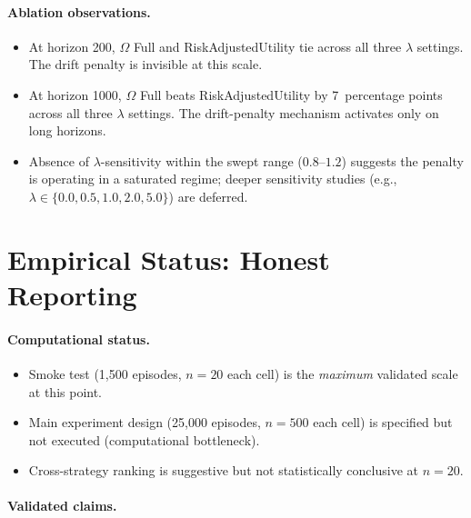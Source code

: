 \paragraph{Ablation observations.}

\begin{itemize}
\item At horizon 200, $\Omega$ Full and RiskAdjustedUtility tie
across all three $\lambda$ settings. The drift penalty is invisible
at this scale.
\item At horizon 1000, $\Omega$ Full beats RiskAdjustedUtility by
7~percentage points across all three $\lambda$ settings. The
drift-penalty mechanism activates only on long horizons.
\item Absence of $\lambda$-sensitivity within the swept range
($0.8$--$1.2$) suggests the penalty is operating in a saturated
regime; deeper sensitivity studies (e.g., $\lambda \in \{0.0, 0.5,
1.0, 2.0, 5.0\}$) are deferred.
\end{itemize}

\section{Empirical Status: Honest Reporting}
\label{sec:empirical-honest-status}


\paragraph{Computational status.}

\begin{itemize}
\item Smoke test (1{,}500 episodes, $n = 20$ each cell) is the
\emph{maximum} validated scale at this point.
\item Main experiment design (25{,}000 episodes, $n = 500$ each
cell) is specified but not executed (computational bottleneck).
\item Cross-strategy ranking is suggestive but not statistically
conclusive at $n = 20$.
\end{itemize}

\paragraph{Validated claims.}

